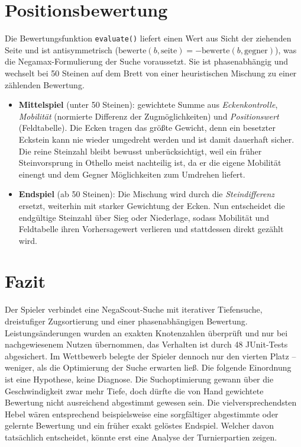 \documentclass[11pt,a4paper, top=1cm]{article}
\begin{document}
\section{Positionsbewertung}
Die Bewertungsfunktion \texttt{evaluate()} liefert einen Wert aus Sicht der ziehenden
Seite und ist antisymmetrisch
($\text{bewerte}(b,\text{seite}) = -\text{bewerte}(b,\text{gegner})$), was die
Negamax-Formulierung der Suche voraussetzt.
Sie ist phasenabhängig und wechselt bei 50 Steinen auf dem Brett von einer heuristischen
Mischung zu einer zählenden Bewertung.
\begin{itemize}
\item \textbf{Mittelspiel} (unter 50 Steinen): gewichtete Summe aus \textit{Eckenkontrolle},
\textit{Mobilität} (normierte Differenz der Zugmöglichkeiten) und \textit{Positionswert} (Feldtabelle).
Die Ecken tragen das größte Gewicht, denn
ein besetzter Eckstein kann nie wieder umgedreht werden und ist damit dauerhaft sicher.
Die reine Steinzahl bleibt bewusst unberücksichtigt, weil ein früher Steinvorsprung in
Othello meist nachteilig ist, da er die eigene Mobilität einengt und dem Gegner
Möglichkeiten zum Umdrehen liefert.
\item \textbf{Endspiel} (ab 50 Steinen): Die Mischung wird durch die \textit{Steindifferenz}
ersetzt, weiterhin mit starker Gewichtung der Ecken. Nun entscheidet die endgültige
Steinzahl über Sieg oder Niederlage, sodass Mobilität und Feldtabelle ihren Vorhersagewert
verlieren und stattdessen direkt gezählt wird.
\end{itemize}


\section{Fazit}
Der Spieler verbindet eine NegaScout-Suche mit iterativer Tiefensuche, dreistufiger
Zugsortierung und einer phasenabhängigen Bewertung.
Leistungsänderungen wurden an exakten Knotenzahlen
überprüft und nur bei nachgewiesenem Nutzen übernommen, das Verhalten ist durch
48 JUnit-Tests abgesichert.
Im Wettbewerb belegte der Spieler dennoch nur den vierten Platz -- weniger, als die
Optimierung der Suche erwarten ließ.
Die folgende Einordnung ist eine Hypothese, keine Diagnose.
Die Suchoptimierung gewann über die Geschwindigkeit zwar mehr Tiefe, doch dürfte die von
Hand gewichtete Bewertung nicht ausreichend abgestimmt gewesen sein.
Die vielversprechendsten Hebel wären entsprechend beispielsweise eine sorgfältiger abgestimmte
oder gelernte Bewertung und ein früher exakt gelöstes Endspiel.
Welcher davon tatsächlich entscheidet, könnte erst eine Analyse der Turnierpartien zeigen.
\end{document}

